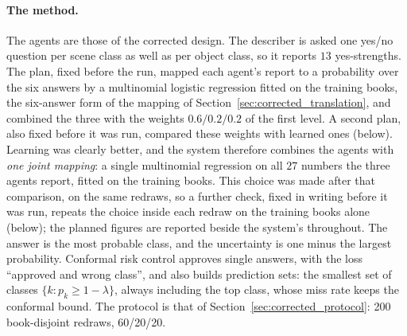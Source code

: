 \paragraph{The method.} The agents are those of the corrected design. The describer is asked one yes/no question per scene class as well as per object class, so it reports $13$ yes-strengths. The plan, fixed before the run, mapped each agent's report to a probability over the six answers by a multinomial logistic regression fitted on the training books, the six-answer form of the mapping of Section~\ref{sec:corrected_translation}, and combined the three with the weights $0.6/0.2/0.2$ of the first level. A second plan, also fixed before it was run, compared these weights with learned ones (below). Learning was clearly better, and the system therefore combines the agents with \emph{one joint mapping}: a single multinomial regression on all $27$ numbers the three agents report, fitted on the training books. This choice was made after that comparison, on the same redraws, so a further check, fixed in writing before it was run, repeats the choice inside each redraw on the training books alone (below); the planned figures are reported beside the system's throughout. The answer is the most probable class, and the uncertainty is one minus the largest probability. Conformal risk control approves single answers, with the loss ``approved and wrong class'', and also builds prediction sets: the smallest set of classes $\{k : p_k \ge 1 - \lambda\}$, always including the top class, whose miss rate keeps the conformal bound. The protocol is that of Section~\ref{sec:corrected_protocol}: 200 book-disjoint redraws, 60/20/20.

